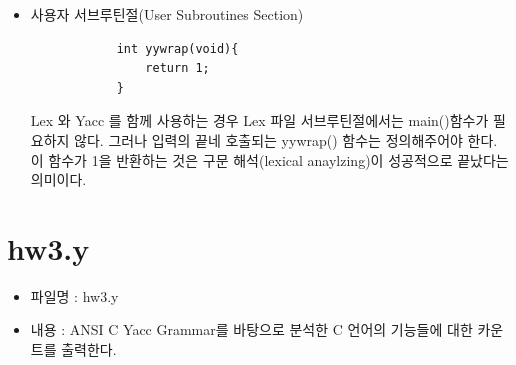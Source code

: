 \documentclass{article}
\begin{document}
\begin{itemize}
\begin{itemize}
		\item {\bf 규칙절 : 공백}
		\begin{lstlisting}
		[ \t\v\n\f.]		{;}
		\end{lstlisting}
		공백 또는 위해서 작성한 규칙 이외의 문자열(.)은 무시한다.
	\end{itemize}

	\item 사용자 서브루틴절(User Subroutines Section)	
		\begin{lstlisting}
			int yywrap(void){
				return 1;
			}
		\end{lstlisting}
		Lex 와 Yacc 를 함께 사용하는 경우 Lex 파일 서브루틴절에서는 main()함수가 필요하지 않다.
		그러나 입력의 끝네 호출되는 yywrap() 함수는 정의해주어야 한다. 이 함수가 1을 반환하는 것은 구문
		해석(lexical anaylzing)이 성공적으로 끝났다는 의미이다.
\end{itemize}

\newpage

\section{hw3.y}

\begin{itemize}
	\item 파일명 : hw3.y
	\item 내용 : ANSI C Yacc Grammar를 바탕으로 분석한 C 언어의 기능들에 대한 카운트를 출력한다.
\end{itemize}
\end{document}
